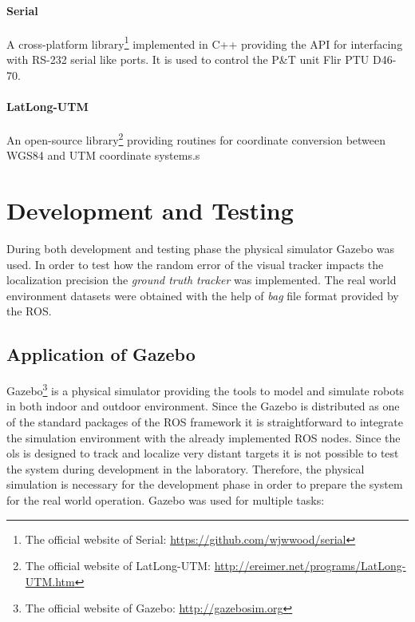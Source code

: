 \paragraph{Serial} A cross-platform library\footnote{The official website of Serial: \url{https://github.com/wjwwood/serial}} implemented in C++ providing the API for interfacing with RS-232 serial like ports. It is used to control the P\&T unit Flir PTU D46-70.

\paragraph{LatLong-UTM} An open-source library\footnote{The official website of LatLong-UTM: \url{http://ereimer.net/programs/LatLong-UTM.htm}} providing routines for coordinate conversion between WGS84 and UTM coordinate systems.s

\section{Development and Testing} \label{txt:development_and_testing}

During both development and testing phase the physical simulator Gazebo was used. In order to test how the random error of the visual tracker impacts the localization precision the \textit{ground truth tracker} was implemented. The real world environment datasets were obtained with the help of \textit{bag} file format provided by the ROS.

\subsection{Application of Gazebo} \label{txt:application_of_gazebo}

Gazebo\footnote{The official website of Gazebo: \url{http://gazebosim.org}} is a physical simulator providing the tools to model and simulate robots in both indoor and outdoor environment. Since the Gazebo is distributed as one of the standard packages of the ROS framework it is straightforward to integrate the simulation environment with the already implemented ROS nodes. Since the \gls{ols} is designed to track and localize very distant targets it is not possible to test the system during development in the laboratory. Therefore, the physical simulation is necessary for the development phase in order to prepare the system for the real world operation. Gazebo was used for multiple tasks:

